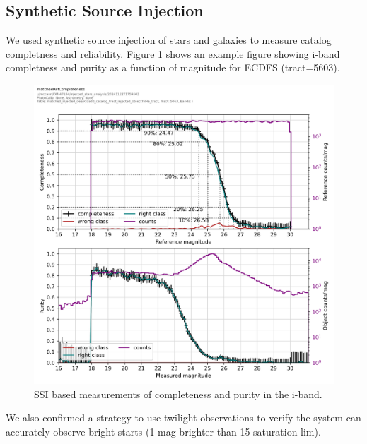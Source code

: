 \subsection{Synthetic Source Injection}

We used synthetic source injection of stars and galaxies to measure catalog completness and reliability. 
Figure \ref{fig:ssi_comp} shows an example figure showing i-band completness and purity as a function of magnitude for ECDFS (tract=5603).
\begin{figure}
    \includegraphics{sample_production_figures/matched_ref_completness_ssi_i.png}
    \caption{SSI based measurements of completeness and purity in the i-band.}
    \label{fig:ssi_comp}
\end{figure}

We also confirmed a strategy to use twilight observations to verify the system can accurately observe bright starts (1 mag brighter than 15 saturation lim). 

  
  